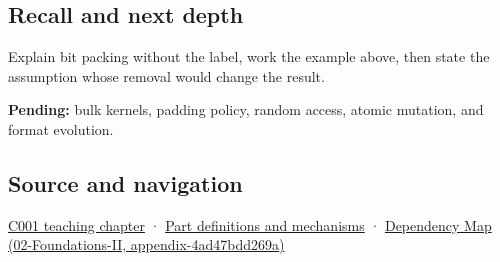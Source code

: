 \subsection{Recall and next depth}\label{appendix-1f9963e1a5d1-recall-and-next-depth}

Explain bit packing without the label, work the example above, then state the assumption whose removal would change the result.

\textbf{Pending:} bulk kernels, padding policy, random access, atomic mutation, and format evolution.

\subsection{Source and navigation}\label{appendix-1f9963e1a5d1-source-and-navigation}

\hyperref[01-foundations-i-ch001-from-a-signal-to-an-interpretation]{C001 teaching chapter} · \hyperref[appendix-fd090d982a15]{Part definitions and mechanisms} · \href{../02-Foundations-II/main.pdf\#nameddest=appendix-4ad47bdd269a}{Dependency Map (02-Foundations-II, appendix-4ad47bdd269a)}
